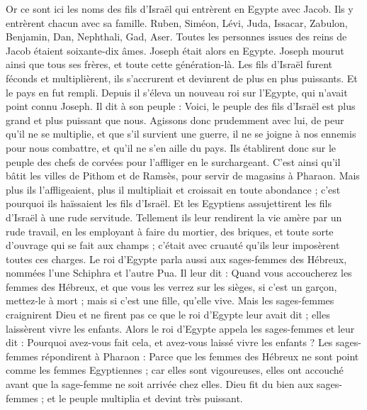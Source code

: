 \begin{multicols}{2}
\VerseOne{}Or ce sont ici les noms des fils d'Israël qui entrèrent en Egypte avec Jacob. Ils y entrèrent chacun avec sa famille.
Ruben, Siméon, Lévi, Juda,
Issacar, Zabulon, Benjamin,
Dan, Nephthali, Gad, Aser.
Toutes les personnes issues des reins de Jacob étaient soixante-dix âmes. Joseph était alors en Egypte.
Joseph mourut ainsi que tous ses frères, et toute cette génération-là.
Les fils d'Israël furent féconds et multiplièrent, ils s’accrurent et devinrent de plus en plus puissants. Et le pays en fut rempli.
Depuis il s'éleva un nouveau roi sur l'Egypte, qui n'avait point connu Joseph.
Il dit à son peuple : Voici, le peuple des fils d'Israël est plus grand et plus puissant que nous.
Agissons donc prudemment avec lui, de peur qu'il ne se multiplie, et que s'il survient une guerre, il ne se joigne à nos ennemis pour nous combattre, et qu'il ne s'en aille du pays.
Ils établirent donc sur le peuple des chefs de corvées pour l'affliger en le surchargeant. C’est ainsi qu’il bâtit les villes de Pithom et de Ramsès, pour servir de magasins à Pharaon.
Mais plus ils l'affligeaient, plus il multipliait et croissait en toute abondance ; c'est pourquoi ils haïssaient les fils d'Israël.
Et les Egyptiens assujettirent les fils d’Israël à une rude servitude.
Tellement ils leur rendirent la vie amère par un rude travail, en les employant à faire du mortier, des briques, et toute sorte d'ouvrage qui se fait aux champs ; c’était avec cruauté qu’ils leur imposèrent toutes ces charges.
Le roi d'Egypte parla aussi aux sages-femmes des Hébreux, nommées l’une Schiphra et l’autre Pua.
Il leur dit : Quand vous accoucherez les femmes des Hébreux, et que vous les verrez sur les sièges, si c'est un garçon, mettez-le à mort ; mais si c'est une fille, qu'elle vive.
Mais les sages-femmes craignirent Dieu et ne firent pas ce que le roi d'Egypte leur avait dit ; elles laissèrent vivre les enfants.
Alors le roi d'Egypte appela les sages-femmes et leur dit : Pourquoi avez-vous fait cela, et avez-vous laissé vivre les enfants ?
Les sages-femmes répondirent à Pharaon : Parce que les femmes des Hébreux ne sont point comme les femmes Egyptiennes ; car elles sont vigoureuses, elles ont accouché avant que la sage-femme ne soit arrivée chez elles.
Dieu fit du bien aux sages-femmes ; et le peuple multiplia et devint très puissant.

\end{multicols}
